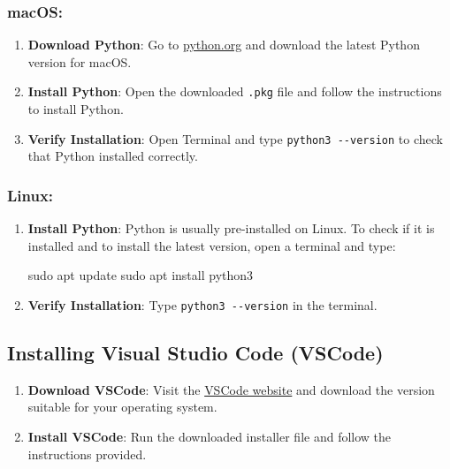 \documentclass[
  letterpaper,
  DIV=11,
  numbers=noendperiod]{scrreprt}
\newenvironment{Shaded}{\begin{snugshade}}{\end{snugshade}}
\newcommand{\FunctionTok}[1]{\textcolor[rgb]{0.28,0.35,0.67}{#1}}
\newcommand{\NormalTok}[1]{\textcolor[rgb]{0.00,0.23,0.31}{#1}}
\providecommand{\tightlist}{%
  \setlength{\itemsep}{0pt}\setlength{\parskip}{0pt}}\usepackage{longtable,booktabs,array}
\begin{document}
\subsubsection{macOS:}\label{macos}

\begin{enumerate}
\def\labelenumi{\arabic{enumi}.}
\tightlist
\item
  \textbf{Download Python}: Go to
  \href{https://www.python.org/downloads/}{python.org} and download the
  latest Python version for macOS.
\item
  \textbf{Install Python}: Open the downloaded \texttt{.pkg} file and
  follow the instructions to install Python.
\item
  \textbf{Verify Installation}: Open Terminal and type
  \texttt{python3\ -\/-version} to check that Python installed
  correctly.
\end{enumerate}

\subsubsection{Linux:}\label{linux}

\begin{enumerate}
\def\labelenumi{\arabic{enumi}.}
\item
  \textbf{Install Python}: Python is usually pre-installed on Linux. To
  check if it is installed and to install the latest version, open a
  terminal and type:

\begin{Shaded}
\begin{Highlighting}[]
\FunctionTok{sudo}\NormalTok{ apt update}
\FunctionTok{sudo}\NormalTok{ apt install python3}
\end{Highlighting}
\end{Shaded}
\item
  \textbf{Verify Installation}: Type \texttt{python3\ -\/-version} in
  the terminal.
\end{enumerate}

\subsection{Installing Visual Studio Code
(VSCode)}\label{installing-visual-studio-code-vscode}

\begin{enumerate}
\def\labelenumi{\arabic{enumi}.}
\tightlist
\item
  \textbf{Download VSCode}: Visit the
  \href{https://code.visualstudio.com/}{VSCode website} and download the
  version suitable for your operating system.
\item
  \textbf{Install VSCode}: Run the downloaded installer file and follow
  the instructions provided.
\end{enumerate}
\end{document}
